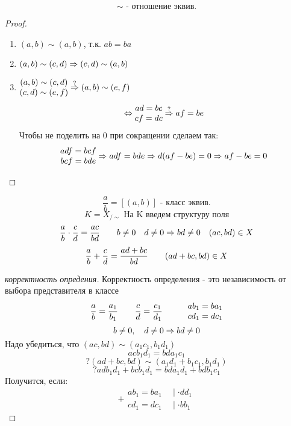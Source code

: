 \documentclass[12pt, fleqn]{article}
\begin{document}
    \begin{Utv}
        \[\sim \text{ - отношение эквив.}\]
    \end{Utv}

    \begin{proof}
        \begin{enumerate}
          \item $(a, b) \sim (a, b)$, т.к. $ab = ba$
          \item $(a, b) \sim (c, d) \Rightarrow (c, d) \sim (a, b)$
          \item $\begin{matrix}
              (a, b) \sim (c, d)\\
              (c, d) \sim (e, f)
          \end{matrix}
          \overset{?}{\Rightarrow} (a, b) \sim (e, f)$
          \[\Leftrightarrow \begin{matrix}
            ad = bc\\
            cf = dc
          \end{matrix}
          \overset{?}{\Rightarrow} af = be\]
          Чтобы не поделить на 0 при сокращении сделаем так:
          \[\begin{matrix}
            adf = bcf \\
            bcf = bde
          \end{matrix}
          \Rightarrow adf = bde \Rightarrow d(af - be) = 0 \Rightarrow af - be = 0\]
        \end{enumerate}
    \end{proof}

    \begin{Definition}
        \[\frac{a}{b} = [(a, b)] \text{ - класс эквив.} \]
        \[K = X_{/\sim} \text{ На K введем структуру поля}\]
        \[\frac{a}{b} \cdot \frac{c}{d} = \frac{ac}{bd} \quad \quad b \neq 0 \quad d \neq 0 \Rightarrow bd \neq 0 \quad (ac, bd) \in X\]
        \[\frac{a}{b} + \frac{c}{d} = \frac{ad + bc}{bd} \quad\quad (ad + bc, bd) \in X\]
    \end{Definition}

    \begin{proof}[корректность опредения]
       Корректность определения - это независимость от выбора представителя в классе
        \[\frac{a}{b} = \frac{a_1}{b_1} \quad\quad \frac{c}{d} = \frac{c_1}{d_1} \quad\quad\quad
        \begin{matrix}
            ab_1 = ba_1\\
            cd_1 = dc_1
        \end{matrix}\]
        \[b \neq 0, \quad d \neq 0 \Rightarrow bd \neq 0\]
        $\text{Надо убедиться, что }(ac, bd) \sim (a_1 c_1, b_1 d_1)$
        \[a c b_1 d_1 = bd a_1 c_1\]
        \[? (ad + bc, bd) \sim (a_1 d_1 + b_1 c_1, b_1 d_1)\]
        \[? ad b_1 d_1 + bc b_1 d_1 = bd a_1 d_1 + bd b_1 c_1\]
        Получится, если:
        \[+ \begin{matrix}
            ab_1 = ba_1 & \ \mid \cdot dd_1\\
            cd_1 = dc_1 & \ \mid \cdot bb_1
        \end{matrix}\]
    \end{proof}
\end{document}
